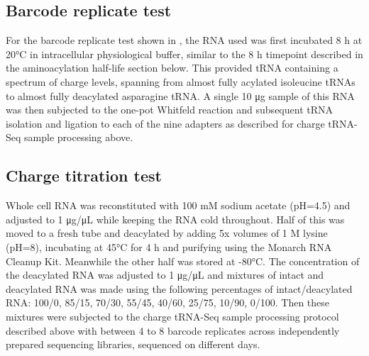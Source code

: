 \documentclass[9pt,lineno]{elife}
\begin{document}
\subsection{Barcode replicate test}
For the barcode replicate test shown in , the RNA used was first incubated 8 h at 20°C in intracellular physiological buffer, similar to the 8 h timepoint described in the aminoacylation half-life section below.
This provided tRNA containing a spectrum of charge levels, spanning from almost fully acylated isoleucine tRNAs to almost fully deacylated asparagine tRNA.
A single 10 μg sample of this RNA was then subjected to the one-pot Whitfeld reaction and subsequent tRNA isolation and ligation to each of the nine adapters as described for charge tRNA-Seq sample processing above.



\subsection{Charge titration test}
Whole cell RNA was reconstituted with 100 mM sodium acetate (pH=4.5) and adjusted to 1 μg/μL while keeping the RNA cold throughout.
Half of this was moved to a fresh tube and deacylated by adding 5x volumes of 1 M lysine (pH=8), incubating at 45°C for 4 h and purifying using the Monarch RNA Cleanup Kit.
Meanwhile the other half was stored at -80°C.
The concentration of the deacylated RNA was adjusted to 1 μg/μL and mixtures of intact and deacylated RNA was made using the following percentages of intact/deacylated RNA: 100/0, 85/15, 70/30, 55/45, 40/60, 25/75, 10/90, 0/100.
Then these mixtures were subjected to the charge tRNA-Seq sample processing protocol described above with between 4 to 8 barcode replicates across independently prepared sequencing libraries, sequenced on different days.
\end{document}
